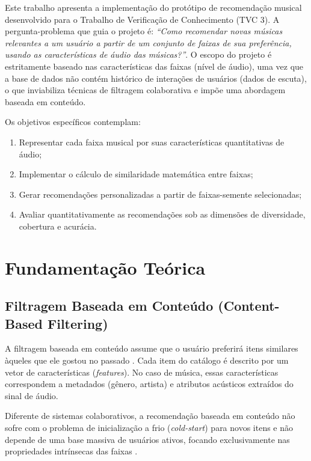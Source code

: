 \documentclass[12pt]{article}
\begin{document}
Este trabalho apresenta a implementação do protótipo de recomendação musical desenvolvido para o Trabalho de Verificação de Conhecimento (TVC 3). A pergunta-problema que guia o projeto é: \textit{``Como recomendar novas músicas relevantes a um usuário a partir de um conjunto de faixas de sua preferência, usando as características de áudio das músicas?''}. O escopo do projeto é estritamente baseado nas características das faixas (nível de áudio), uma vez que a base de dados não contém histórico de interações de usuários (dados de escuta), o que inviabiliza técnicas de filtragem colaborativa e impõe uma abordagem baseada em conteúdo.

Os objetivos específicos contemplam:
\begin{enumerate}
    \item Representar cada faixa musical por suas características quantitativas de áudio;
    \item Implementar o cálculo de similaridade matemática entre faixas;
    \item Gerar recomendações personalizadas a partir de faixas-semente selecionadas;
    \item Avaliar quantitativamente as recomendações sob as dimensões de diversidade, cobertura e acurácia.
\end{enumerate}

\section{Fundamentação Teórica}
\subsection{Filtragem Baseada em Conteúdo (Content-Based Filtering)}
A filtragem baseada em conteúdo assume que o usuário preferirá itens similares àqueles que ele gostou no passado \cite{lops2011content}. Cada item do catálogo é descrito por um vetor de características (\textit{features}). No caso de música, essas características correspondem a metadados (gênero, artista) e atributos acústicos extraídos do sinal de áudio. 

Diferente de sistemas colaborativos, a recomendação baseada em conteúdo não sofre com o problema de inicialização a frio (\textit{cold-start}) para novos itens e não depende de uma base massiva de usuários ativos, focando exclusivamente nas propriedades intrínsecas das faixas \cite{ricci2015recommender}.
\end{document}
